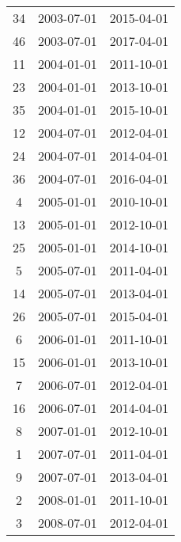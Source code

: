 \begin{tabular}{ccc}
  34 & 2003-07-01 & 2015-04-01 \\ 
  46 & 2003-07-01 & 2017-04-01 \\ 
  11 & 2004-01-01 & 2011-10-01 \\ 
  23 & 2004-01-01 & 2013-10-01 \\ 
  35 & 2004-01-01 & 2015-10-01 \\ 
  12 & 2004-07-01 & 2012-04-01 \\ 
  24 & 2004-07-01 & 2014-04-01 \\ 
  36 & 2004-07-01 & 2016-04-01 \\ 
  4 & 2005-01-01 & 2010-10-01 \\ 
  13 & 2005-01-01 & 2012-10-01 \\ 
  25 & 2005-01-01 & 2014-10-01 \\ 
  5 & 2005-07-01 & 2011-04-01 \\ 
  14 & 2005-07-01 & 2013-04-01 \\ 
  26 & 2005-07-01 & 2015-04-01 \\ 
  6 & 2006-01-01 & 2011-10-01 \\ 
  15 & 2006-01-01 & 2013-10-01 \\ 
  7 & 2006-07-01 & 2012-04-01 \\ 
  16 & 2006-07-01 & 2014-04-01 \\ 
  8 & 2007-01-01 & 2012-10-01 \\ 
  1 & 2007-07-01 & 2011-04-01 \\ 
  9 & 2007-07-01 & 2013-04-01 \\ 
  2 & 2008-01-01 & 2011-10-01 \\ 
  3 & 2008-07-01 & 2012-04-01 \\ 
   \hline
\end{tabular}
